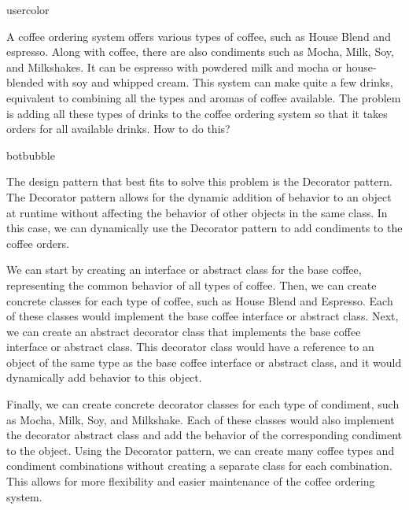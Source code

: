 \begin{chatquest}{usercolor}{}

A coffee ordering system offers various types of coffee, such as House Blend and espresso. Along with coffee, there are also condiments such as Mocha, Milk, Soy, and Milkshakes.
It can be espresso with powdered milk and mocha or house-blended with soy and whipped cream. This system can make quite a few drinks, equivalent to combining all the types and aromas of coffee available.
The problem is adding all these types of drinks to the coffee ordering system so that it takes orders for all available drinks. How to do this?
\end{chatquest}

\begin{chatout}{botbubble}{}

The design pattern that best fits to solve this problem is the Decorator pattern. The Decorator pattern allows for the dynamic addition of behavior to an object at runtime without affecting the behavior of other objects in the same class. In this case, we can dynamically use the Decorator pattern to add condiments to the coffee orders.

We can start by creating an interface or abstract class for the base coffee, representing the common behavior of all types of coffee. Then, we can create concrete classes for each type of coffee, such as House Blend and Espresso. Each of these classes would implement the base coffee interface or abstract class. Next, we can create an abstract decorator class that implements the base coffee interface or abstract class. This decorator class would have a reference to an object of the same type as the base coffee interface or abstract class, and it would dynamically add behavior to this object.

Finally, we can create concrete decorator classes for each type of condiment, such as Mocha, Milk, Soy, and Milkshake. Each of these classes would also implement the decorator abstract class and add the behavior of the corresponding condiment to the object. Using the Decorator pattern, we can create many coffee types and condiment combinations without creating a separate class for each combination. This allows for more flexibility and easier maintenance of the coffee ordering system.
\end{chatout}





